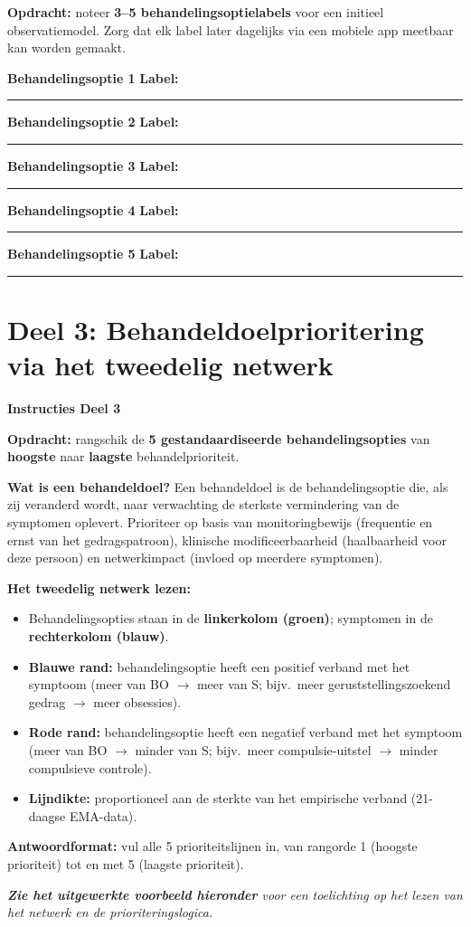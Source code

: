 \documentclass[11pt,a4paper]{article}
\newcommand{\behandelingsoptieslot}[1]{%
\vspace{0.25em}\noindent
\begin{tcolorbox}[colback=SoftBG,colframe=BorderGrey,boxrule=0.4pt,arc=1.5mm,left=8pt,right=8pt,top=5pt,bottom=5pt]%
\small\textbf{\color{SlateMid}Behandelingsoptie #1}\hspace{1em}%
\textbf{Label:}\hspace{0.5em}\rule{0.56\linewidth}{0.25pt}%
\end{tcolorbox}%
}
\begin{document}
\begin{responsebox}[title={Uw antwoord -- Deel 2}]
\small\textbf{Opdracht:} noteer \textbf{3--5 behandelingsoptielabels} voor een initieel observatiemodel.
Zorg dat elk label later dagelijks via een mobiele app meetbaar kan worden gemaakt.

\behandelingsoptieslot{1}
\behandelingsoptieslot{2}
\behandelingsoptieslot{3}
\behandelingsoptieslot{4}
\behandelingsoptieslot{5}
\end{responsebox}

\vspace{0.6em}
\newpage


\section{Deel 3: Behandeldoelprioritering via het tweedelig netwerk}

\begin{tcolorbox}[colback=yellow!5,colframe=GoldAmber,arc=2.5mm,boxrule=0.9pt,
  left=10pt,right=10pt,top=9pt,bottom=9pt]
\textbf{\color{GoldAmber}Instructies Deel 3}

\smallskip\small
\textbf{Opdracht:} rangschik de \textbf{5 gestandaardiseerde behandelingsopties} van
\textbf{hoogste} naar \textbf{laagste} behandelprioriteit.

\textbf{Wat is een behandeldoel?}
Een behandeldoel is de behandelingsoptie die, als zij veranderd wordt, naar verwachting de
sterkste vermindering van de symptomen oplevert. Prioriteer op basis van monitoringbewijs
(frequentie en ernst van het gedragspatroon), klinische modificeerbaarheid
(haalbaarheid voor deze persoon) en netwerkimpact (invloed op meerdere symptomen).

\textbf{Het tweedelig netwerk lezen:}
\begin{itemize}[topsep=2pt,itemsep=1pt]
\item Behandelingsopties staan in de \textbf{linkerkolom (groen)}; symptomen in de \textbf{rechterkolom (blauw)}.
\item \textbf{Blauwe rand:} behandelingsoptie heeft een positief verband met het symptoom
(meer van BO $\rightarrow$ meer van S; bijv.\ meer geruststellingszoekend gedrag $\rightarrow$ meer obsessies).
\item \textbf{Rode rand:} behandelingsoptie heeft een negatief verband met het symptoom
(meer van BO $\rightarrow$ minder van S; bijv.\ meer compulsie-uitstel $\rightarrow$ minder compulsieve controle).
\item \textbf{Lijndikte:} proportioneel aan de sterkte van het empirische verband
(21-daagse EMA-data).
\end{itemize}

\textbf{Antwoordformat:} vul alle 5 prioriteitslijnen in, van rangorde 1 (hoogste prioriteit)
tot en met 5 (laagste prioriteit).

\medskip
\textit{\textbf{Zie het uitgewerkte voorbeeld hieronder} voor een toelichting op het lezen van het netwerk en de prioriteringslogica.}
\end{tcolorbox}
\end{document}
